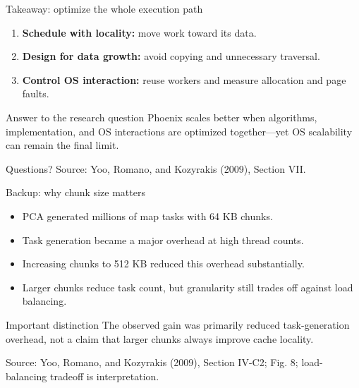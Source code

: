 \documentclass[aspectratio=169,11pt]{beamer}
\newcommand{\src}[1]{\vfill{\tiny\color{gray}Source: Yoo, Romano, and Kozyrakis (2009), #1.}}
\begin{document}
\begin{frame}{Takeaway: optimize the whole execution path}
\begin{enumerate}
\item \textbf{Schedule with locality:} move work toward its data.
\item \textbf{Design for data growth:} avoid copying and unnecessary traversal.
\item \textbf{Control OS interaction:} reuse workers and measure allocation and page faults.
\end{enumerate}
\vspace{.4cm}
\begin{block}{Answer to the research question}
Phoenix scales better when algorithms, implementation, and OS interactions are optimized together---yet OS scalability can remain the final limit.
\end{block}
\centering\large Questions?
\src{Section VII}
\end{frame}

\appendix
\begin{frame}{Backup: why chunk size matters}
\begin{itemize}
\item PCA generated millions of map tasks with 64 KB chunks.
\item Task generation became a major overhead at high thread counts.
\item Increasing chunks to 512 KB reduced this overhead substantially.
\item Larger chunks reduce task count, but granularity still trades off against load balancing.
\end{itemize}
\begin{block}{Important distinction}
The observed gain was primarily reduced task-generation overhead, not a claim that larger chunks always improve cache locality.
\end{block}
\src{Section IV-C2; Fig. 8; load-balancing tradeoff is interpretation}
\end{frame}
\end{document}
